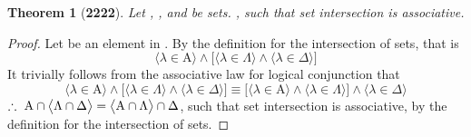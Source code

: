 \documentclass[preview]{standalone}
\newtheorem{theorem}{Theorem}
\begin{document}
\begin{theorem}[\textbf{2222}]
    Let , \bm{$\Lambda$}, and \bm{$\Delta$} be sets. 
    , 
    such that set intersection is associative.
\end{theorem}
\begin{proof}
    Let \bm{$\lambda$} be an element in 
    . 
    By the definition for the intersection of sets, that is 
    \begin{equation*}
        \Big \langle \lambda \in \mathrm{A} \Big \rangle
            \land
        \bigg[
            \Big \langle \lambda \in \Lambda \Big \rangle
                \land
            \Big \langle \lambda \in \Delta \Big \rangle
        \bigg]
    \end{equation*}
    It trivially follows from the associative law for logical conjunction that
    \begin{equation*}
        \Big \langle \lambda \in \mathrm{A} \Big \rangle
            \land
        \bigg[
            \Big \langle \lambda \in \Lambda \Big \rangle
                \land
            \Big \langle \lambda \in \Delta \Big \rangle
        \bigg]
            \equiv
        \bigg[
            \Big \langle \lambda \in \mathrm{A} \Big \rangle
                \land
            \Big \langle \lambda \in \Lambda \Big \rangle
        \bigg]
            \land
        \Big \langle \lambda \in \Delta \Big \rangle
    \end{equation*}
    $
    \therefore \text{\space} \relax{
    \mathrm{A} 
        \cap 
    \big \langle \Lambda \cap \Delta \big \rangle 
        = 
    \big \langle \mathrm{A} \cap \Lambda \big \rangle
        \cap 
    \Delta
    }$,
    such that set intersection is associative,
    by the definition for the intersection of sets.
\end{proof}
\end{document}
